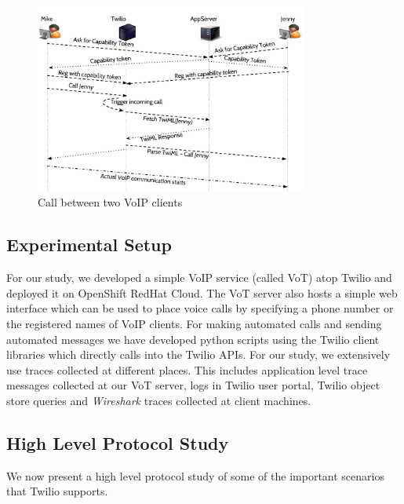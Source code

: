 \begin{figure}[t!] 
\centering
  \includegraphics[width=0.8\textwidth]{figs/twoclients.pdf}
\caption{Call between two VoIP clients}
\label{fig:2VoIPcall}
\end{figure}
\subsection{Experimental Setup}

For our study, we developed a simple VoIP service (called VoT) atop Twilio and deployed it on OpenShift RedHat Cloud. The VoT server also hosts a simple web interface which can be used to place voice calls by specifying a phone number or the registered names of VoIP clients. For making automated calls and sending automated messages we have developed python scripts using the Twilio client libraries which directly calls into the Twilio APIs. For our study, we extensively use traces collected at different places. This includes application level trace messages collected at our VoT server, logs in Twilio user portal, Twilio object store queries and \textit{Wireshark} traces collected at client machines.

\subsection{High Level Protocol Study}
\label{subsec-protostudy}
We now present a high level protocol study of some of the important scenarios that Twilio supports. 

